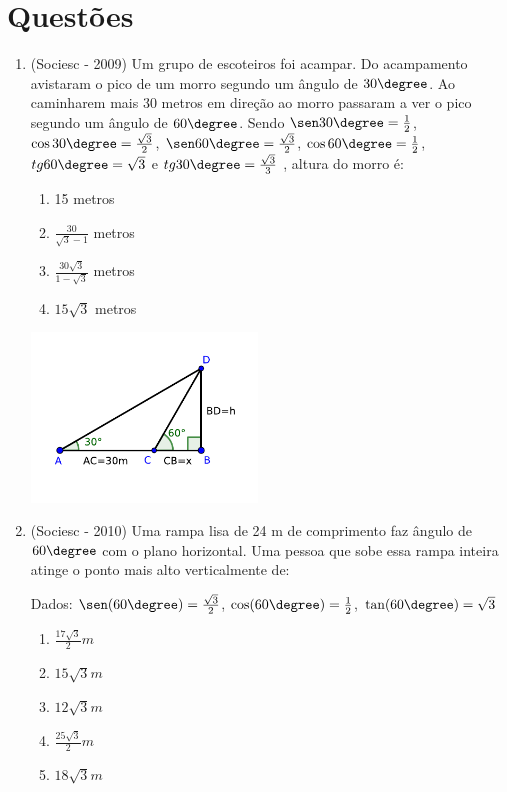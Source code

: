  \section{Questões}
\begin{enumerate}
 \item (Sociesc - 2009) Um grupo de escoteiros foi acampar. Do acampamento avistaram o pico de um morro segundo um ângulo de $30 \degree$. Ao caminharem mais 30 metros em direção ao morro passaram a ver o pico segundo um ângulo de $60 \degree$. Sendo $\sen 30\degree = \frac{1}{2}$, $\cos 30\degree =\frac{\sqrt{3}}{2}$, $\sen 60\degree =\frac{\sqrt{3}}{2}$, $\cos 60\degree =\frac{1}{2}$, $tg 60\degree = \sqrt{3}$ e $tg 30\degree =\frac{\sqrt{3}}{3}$ , altura do morro é:
 \begin{multicols}{2}

 \begin{enumerate}
  \item 15 metros
  \item $\frac{30}{\sqrt{3}-1}$ metros
  \item $\frac{30\sqrt{3}}{1-\sqrt{3}}$ metros
  \item $15\sqrt{3}$ metros
 \end{enumerate}

 \includegraphics[width=6cm]{../Capitulos/Figuras/tri_ret_exer.pdf}

 \end{multicols}

 \item (Sociesc - 2010) Uma rampa lisa de 24 m de comprimento faz ângulo de $60\degree$ com o plano horizontal. Uma pessoa que sobe essa rampa inteira atinge o ponto mais alto verticalmente de:

  Dados: $\sen (60\degree)= \frac{\sqrt{3}}{2}$, $\cos (60\degree)= \frac{1}{2}$, $\tan (60\degree)= \sqrt{3}$
 \begin{multicols}{2}

 \begin{enumerate}
  \item $\frac{17 \sqrt{3}}{2} m$
  \item $15\sqrt{3} m$
  \item $12\sqrt{3} m$
  \item $\frac{25 \sqrt{3}}{2} m$
  \item $18\sqrt{3} m$
 \end{enumerate}


\end{multicols}
\end{enumerate}

